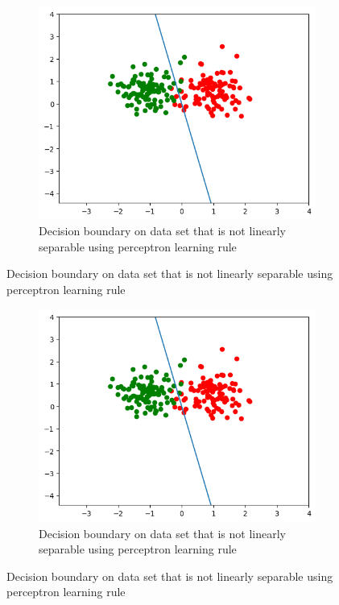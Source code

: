 \documentclass[a4paper]{article}
\begin{document}
\begin{figure}[htb]
    \centering
    \begin{subfigure}{0.4\textwidth}
        \includegraphics[width=\textwidth]{Labs/Lab 1/Lab 1a/Results/perceptron_learning_nonLinear_with_bias.png}
        \caption{Decision boundary on data set that is not linearly separable  using perceptron learning rule}
        \label{fig:Decision-boundary-not-linearly-separable}
    \end{subfigure}
    \hfill
\end{figure}

\begin{figure}[htb]
    \centering
    \begin{subfigure}{0.4\textwidth}
        \includegraphics[width=\textwidth]{Labs/Lab 1/Lab 1a/Results/perceptron_learning_nonLinear_with_bias.png}
        \caption{Decision boundary on data set that is not linearly separable  using perceptron learning rule}
        \label{fig:Decision-boundary-not-linearly-separable}
    \end{subfigure}
    \hfill
\end{figure}
\end{document}
